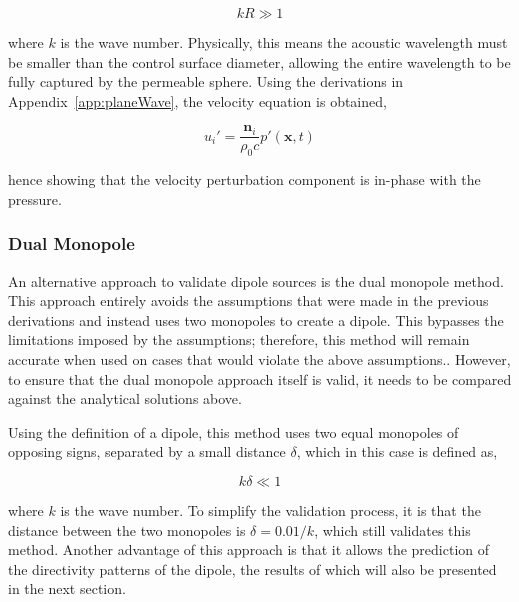 \begin{equation}
    kR \gg 1
    \label{eq:far_field_def}
\end{equation}

where $k$ is the wave number. Physically, this means the acoustic wavelength must be smaller than the control surface diameter, allowing the entire wavelength to be fully captured by the permeable sphere. Using the derivations in Appendix~\ref{app:planeWave}, the velocity equation is obtained,

\begin{equation}
    u_i' = \frac{\textbf{n}_i}{\rho_0c}p'(\bm{x},t)
    \label{eq:dipole_u2}
\end{equation}

hence showing that the velocity perturbation component is in-phase with the pressure.

\subsubsection{Dual Monopole} \label{subsubsec:dual_mono}

An alternative approach to validate dipole sources is the dual monopole method. This approach entirely avoids the assumptions that were made in the previous derivations and instead uses two monopoles to create a dipole. This bypasses the limitations imposed by the assumptions; therefore, this method will remain accurate when used on cases that would violate the above assumptions.. However, to ensure that the dual monopole approach itself is valid, it needs to be compared against the analytical solutions above.

Using the definition of a dipole, this method uses two equal monopoles of opposing signs, separated by a small distance $\delta$, which in this case is defined as,

\begin{equation}
    k\delta \ll 1
    \label{eq:delta_distance_def}
\end{equation}

where $k$ is the wave number. To simplify the validation process, it is that the distance between the two monopoles is $\delta=0.01/k$, which still validates this method. Another advantage of this approach is that it allows the prediction of the directivity patterns of the dipole, the results of which will also be presented in the next section.